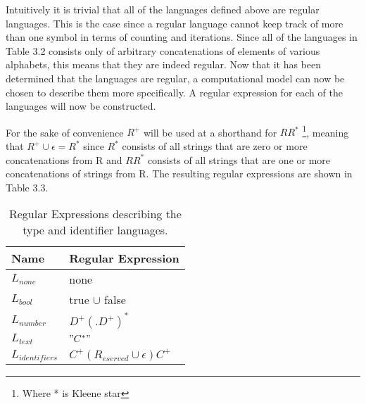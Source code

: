 Intuitively it is trivial that all of the languages defined above are regular languages.
This is the case since a regular language cannot keep track of more than one symbol in terms of counting and iterations.
Since all of the languages in Table 3.2 consists only of arbitrary concatenations of elements of various alphabets, this means that they are indeed regular. 
Now that it has been determined that the languages are regular, a computational model can now be chosen to describe them more specifically.
A regular expression for each of the languages will now be constructed.

For the sake of convenience $R^+$ will be used at a shorthand for $RR^*$ \footnote{Where * is Kleene star}, meaning that $R^+ \cup \epsilon = R^*$ since $R^*$ consists of all strings that are zero or more concatenations from R and $RR^*$ consists of all strings that are one or more concatenations of strings from R.
The resulting regular expressions are shown in Table 3.3.

\begin{table}[!htb]
	\centering
	\label{my-label}
	\begin{tabular}{|l|l|}
		\hline
		\textbf{Name}     & \textbf{Regular Expression}         \\ \hline
		$L_{none}$        & none                                \\ \hline
		$L_{bool}$        & true $\cup$ false                   \\ \hline
		$L_{number}$      & $D^+(.D^+)^*$                       \\ \hline
		$L_{text}$        & $"C^*"$                               \\ \hline
		$L_{identifiers}$ & $C^+(R_{eserved} \cup \epsilon)C^+$ \\ \hline
	\end{tabular}
	\caption{Regular Expressions describing the type and identifier languages.}
\end{table}



